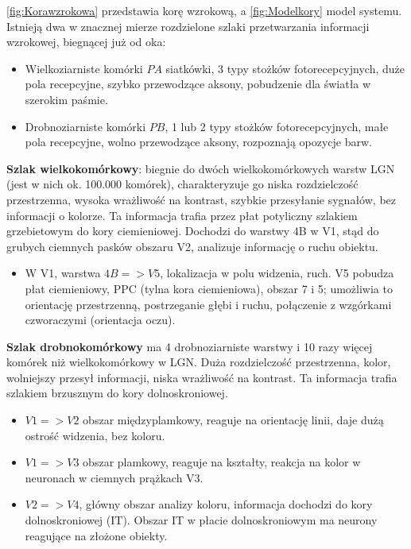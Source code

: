 \ref{fig:Korawzrokowa} przedstawia korę wzrokową, a \ref{fig:Modelkory} model systemu. Istnieją dwa w znacznej mierze rozdzielone szlaki przetwarzania informacji wzrokowej, biegnącej już od oka:
\begin{itemize}
\item Wielkoziarniste komórki $PA$ siatkówki, 3 typy stożków fotorecepcyjnych, duże pola recepcyjne, szybko przewodzące aksony, pobudzenie dla światła w szerokim paśmie.
\item Drobnoziarniste komórki $PB$, 1 lub 2 typy stożków fotorecepcyjnych, małe pola recepcyjne, wolno przewodzące aksony, rozpoznają opozycje barw.
\end{itemize}
\textbf{Szlak wielkokomórkowy}: biegnie do dwóch wielkokomórkowych warstw LGN (jest w nich ok. 100.000 komórek), charakteryzuje go niska rozdzielczość przestrzenna, wysoka wrażliwość na kontrast, szybkie przesyłanie sygnałów, bez informacji o kolorze.
Ta informacja trafia przez płat potyliczny szlakiem grzebietowym do kory ciemieniowej.
Dochodzi do warstwy 4B w V1, stąd do grubych ciemnych pasków obszaru V2, analizuje informację o ruchu obiektu.
\begin{itemize}
\item W V1, warstwa $4B => V5$, lokalizacja w polu widzenia, ruch.
V5 pobudza płat ciemieniowy, PPC (tylna kora ciemieniowa), obszar 7 i 5; umożliwia to orientację przestrzenną, postrzeganie głębi i ruchu, połączenie z wzgórkami czworaczymi (orientacja oczu).
\end{itemize}
\textbf{Szlak drobnokomórkowy} ma 4 drobnoziarniste warstwy i 10 razy więcej komórek niż wielkokomórkowy w LGN.
Duża rozdzielczość przestrzenna, kolor, wolniejszy przesył informacji, niska wrażliwość na kontrast.
Ta informacja trafia szlakiem brzusznym do kory dolnoskroniowej.
\begin{itemize}
\item $V1 => V2$ obszar międzyplamkowy, reaguje na orientację linii, daje dużą ostrość widzenia, bez koloru.
\item $V1 => V3$ obszar plamkowy, reaguje na kształty, reakcja na kolor w neuronach w ciemnych prążkach V3.
\item $V2 => V4$, główny obszar analizy koloru, informacja dochodzi do kory dolnoskroniowej (IT).
Obszar IT w płacie dolnoskroniowym ma neurony reagujące na złożone obiekty. 
\end{itemize}



